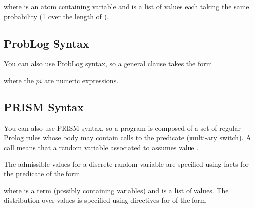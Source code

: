 \documentclass[letterpaper,10pt,english]{sphinxmanual}
\begin{document}
where  is an atom containing variable  and  is a list of values each taking the same probability (1 over the length of ).


\subsection{ProbLog Syntax}
\label{\detokenize{index:problog-syntax}}
You can also use ProbLog  syntax, so a general clause takes the form

\begin{sphinxVerbatim}[commandchars=\\\{\}]
      
\end{sphinxVerbatim}

where the \(pi\) are numeric expressions.


\subsection{PRISM Syntax}
\label{\detokenize{index:prism-syntax}}
You can also use PRISM  syntax, so a program is composed of a set of regular Prolog rules whose body may contain calls to the  predicate (multi-ary switch).
A call  means that a random variable associated to  assumes value .

The admissible values for a discrete random variable are specified using facts for the  predicate
of the form

\begin{sphinxVerbatim}[commandchars=\\\{\}]
\end{sphinxVerbatim}

where  is a term (possibly containing variables) and  is a list of values.
The distribution over values is specified using directives for  of the form
\end{document}
